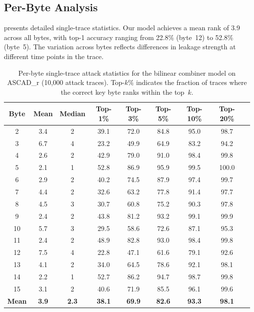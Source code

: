 \documentclass[submission]{iacrtrans}
\begin{document}

\subsection{Per-Byte Analysis}

 presents detailed single-trace statistics. Our model achieves a mean rank of 3.9 across all bytes, with top-1 accuracy ranging from 22.8\% (byte~12) to 52.8\% (byte~5). The variation across bytes reflects differences in leakage strength at different time points in the trace.

\begin{table}[t]
  \centering
  \caption{Per-byte single-trace attack statistics for the bilinear combiner model on ASCAD\_r (10{,}000 attack traces). Top-$k\%$ indicates the fraction of traces where the correct key byte ranks within the top~$k$.}
  \label{tab:perbyte}
  \small
  \begin{tabular}{ccccccccc}
    \toprule
    \textbf{Byte} & \textbf{Mean} & \textbf{Median} & \textbf{Top-1\%} & \textbf{Top-3\%} & \textbf{Top-5\%} & \textbf{Top-10\%} & \textbf{Top-20\%} \\
    \midrule
     2 &  3.4 & 2 & 39.1 & 72.0 & 84.8 & 95.0 & 98.7 \\
     3 &  6.7 & 4 & 23.2 & 49.9 & 64.9 & 83.2 & 94.2 \\
     4 &  2.6 & 2 & 42.9 & 79.0 & 91.0 & 98.4 & 99.8 \\
     5 &  2.1 & 1 & 52.8 & 86.9 & 95.9 & 99.5 & 100.0 \\
     6 &  2.9 & 2 & 40.2 & 74.5 & 87.9 & 97.4 & 99.7 \\
     7 &  4.4 & 2 & 32.6 & 63.2 & 77.8 & 91.4 & 97.7 \\
     8 &  4.5 & 3 & 30.7 & 60.8 & 75.2 & 90.3 & 97.8 \\
     9 &  2.4 & 2 & 43.8 & 81.2 & 93.2 & 99.1 & 99.9 \\
    10 &  5.7 & 3 & 29.5 & 58.6 & 72.6 & 87.1 & 95.3 \\
    11 &  2.4 & 2 & 48.9 & 82.8 & 93.0 & 98.4 & 99.8 \\
    12 &  7.5 & 4 & 22.8 & 47.1 & 61.6 & 79.1 & 92.6 \\
    13 &  4.1 & 2 & 34.0 & 64.5 & 78.6 & 92.1 & 98.1 \\
    14 &  2.2 & 1 & 52.7 & 86.2 & 94.7 & 98.7 & 99.8 \\
    15 &  3.1 & 2 & 40.6 & 71.9 & 85.5 & 96.1 & 99.6 \\
    \midrule
    \textbf{Mean} & \textbf{3.9} & \textbf{2.3} & \textbf{38.1} & \textbf{69.9} & \textbf{82.6} & \textbf{93.3} & \textbf{98.1} \\
    \bottomrule
  \end{tabular}
\end{table}
\end{document}
